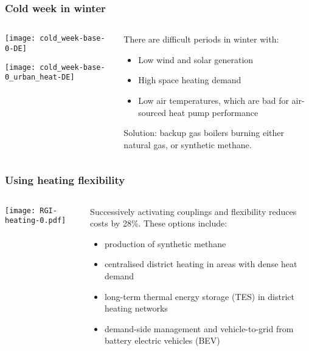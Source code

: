 \documentclass[10pt,aspectratio=169,dvipsnames]{beamer}
\let\olditem\item
\renewcommand{\item}{%
\olditem\vspace{5pt}}
\begin{document}
\begin{frame}
  \frametitle{Cold week in winter}

    \begin{columns}[T]
    \begin{column}{6cm}

  \centering
\texttt{[image: cold\_week-base-0-DE]}

\texttt{[image: cold\_week-base-0\_urban\_heat-DE]}
    \end{column}
    \begin{column}{7cm}
      \vspace{1.5cm}
        There are difficult periods in winter with:
        \begin{itemize}
        \item \alert{Low} wind and solar generation
        \item \alert{High} space heating demand
        \item \alert{Low} air temperatures, which are bad for air-sourced heat pump performance
        \end{itemize}

        Solution: \alert{backup gas boilers} burning either natural gas, or
        synthetic methane.
    \end{column}
    \end{columns}
\end{frame}



\begin{frame}
  \frametitle{Using heating flexibility}
  \begin{columns}[T]
    \begin{column}{8.3cm}
      \texttt{[image: RGI-heating-0.pdf]}
    \end{column}
    \begin{column}{6cm}

      \vspace{.5cm}
        Successively activating couplings and flexibility \alert{reduces costs} by 28\%.
        These options include:
        \begin{itemize}
          \item  production of \alert{synthetic methane}
          \item  centralised \alert{district heating} in areas with dense heat demand
          \item long-term \alert{thermal energy storage} (TES)  in district heating networks
          \item \alert{demand-side management} and vehicle-to-grid from battery electric vehicles (BEV)
        \end{itemize}
    \end{column}
  \end{columns}
\end{frame}
\end{document}
